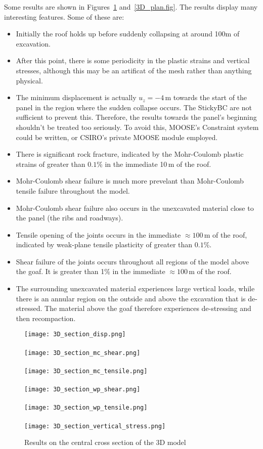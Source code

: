 \documentclass[]{scrreprt}
\begin{document}
Some results are shown in Figures~\ref{3D_section.fig}
and~\ref{3D_plan.fig}.  The results display many interesting
features.  Some of these are:
\begin{itemize}
\item Initially the roof holds up before suddenly collapsing at around
  100m of excavation.
\item After this point, there is some periodicity in the plastic
  strains and vertical stresses, although this may be an
  artificat of the mesh rather than anything physical.
\item The minimum displacement is actually $u_{z}=-4$\,m towards the
  start of the panel in the region where the sudden collapse
  occurs.  The StickyBC are not sufficient to prevent this.
  Therefore, the results towards the panel's beginning shouldn't be
  treated too seriously.  To avoid this, MOOSE's Constraint system
  could be written, or CSIRO's private MOOSE module employed.
\item There is significant rock fracture, indicated by the
  Mohr-Coulomb plastic strains of greater than $0.1$\% in the
  immediate 10\,m of the roof.
\item Mohr-Coulomb shear failure is much more prevelant than
  Mohr-Coulomb tensile failure throughout the model.
\item Mohr-Coulomb shear failure also occurs in the unexcavated
  material close to the panel (the ribs and roadways).
\item Tensile opening of the joints occurs in the immediate $\approx
  100$\,m of the roof, indicated by weak-plane tensile plasticity of
  greater than $0.1$\%.
\item Shear failure of the joints occurs throughout all regions of the
  model above the goaf.  It is greater than 1\% in the immediate
  $\approx 100$\,m of the roof.
\item The surrounding unexcavated material experiences large vertical
  loads, while there is an annular region on the outside and above the
  excavation that is de-stressed.  The material above the goaf
  therefore experiences de-stressing and then recompaction.
\end{itemize}

\begin{figure}[p]
\centering
\texttt{[image: 3D\_section\_disp.png]} \\~\\
\texttt{[image: 3D\_section\_mc\_shear.png]} \\~\\
\texttt{[image: 3D\_section\_mc\_tensile.png]} \\~\\
\texttt{[image: 3D\_section\_wp\_shear.png]} \\~\\
\texttt{[image: 3D\_section\_wp\_tensile.png]} \\~\\
\texttt{[image: 3D\_section\_vertical\_stress.png]}
\caption{\label{3D_section.fig}Results on the central cross section of
  the 3D model}
\end{figure}
\end{document}
